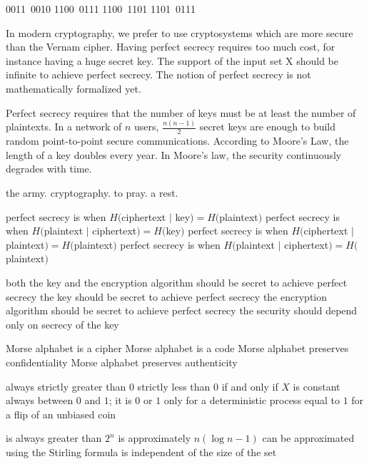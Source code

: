  {0011\ 0010}
 {1100\ 0111}
 {1100\ 1101}
 {1101\ 0111}
 
 {In modern cryptography, we prefer to use cryptosystems which are more secure than the Vernam cipher.}
 {Having perfect secrecy requires too much cost, for instance having a huge secret key.}
 {The support of the input set X should be infinite to achieve perfect secrecy.}
 {The notion of perfect secrecy is not mathematically formalized yet.}
 
{Perfect secrecy requires that the number of keys must be at least the number of plaintexts.}
{In a network of $n$ users, $\frac{n(n-1)}{2}$ secret keys are enough to build random point-to-point secure communications.}
{According to Moore's Law, the length of a key doubles every year.}
{In Moore's law, the security continuously degrades with time.} 

 {the army.}
 {cryptography.}
 {to pray.}
 {a rest.}
 
{perfect secrecy is when $H($ciphertext $|$ key$) = H($plaintext$)$}
{perfect secrecy is when $H($plaintext $|$ ciphertext$) = H($key$)$}
{perfect secrecy is when $H($ciphertext $|$ plaintext$) = H($plaintext$)$}
{perfect secrecy is when $H($plaintext $|$ ciphertext$) = H($plaintext$)$}

{both the key and the encryption algorithm should be secret to achieve perfect secrecy}
{the key should be secret to achieve perfect secrecy}
{the encryption algorithm should be secret to achieve perfect secrecy}
{the security should depend only on secrecy of the key}

{Morse alphabet is a cipher}
{Morse alphabet is a code}
{Morse alphabet preserves confidentiality}
{Morse alphabet preserves authenticity}

{always strictly greater than $0$}
{strictly less than $0$ if and only if $X$ is constant}
{always between $0$ and $1$; it is $0$ or $1$ only for a deterministic process}
{equal to $1$ for a flip of an unbiased coin}

{is always greater than $2^n$}
{is approximately $n(\log n - 1)$}
{can be approximated using the Stirling formula}
{is independent of the size of the set}

